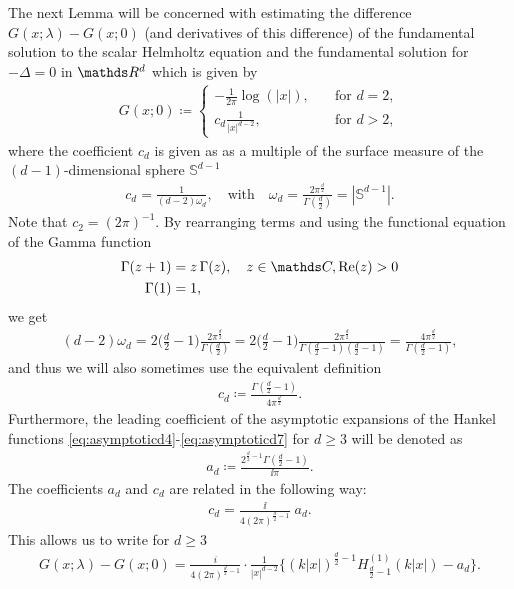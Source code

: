 The next Lemma will be concerned with estimating the difference $G(x;\lambda) - G(x; 0)$ (and derivatives of this difference) of the fundamental solution to the scalar Helmholtz equation and the fundamental solution for $-\Delta = 0$ in $\R^d$ which is given by
\begin{align}
  \label{eq:laplace}
  G(x;0) \coloneqq \begin{cases} -\frac{1}{2\pi} \log(|x|), &\quad\text{for } d = 2, \\c_d \frac{1}{|x|^{d - 2}}, &\quad\text{for } d > 2,  \end{cases}
\end{align}
where the coefficient $c_d$ is given as as a multiple of the surface measure of the $(d-1)$-dimensional sphere $\mathbb{S}^{d - 1}$
\begin{align}
  \label{eq:wd}
  c_d = \frac{1}{(d - 2) \omega_d}, \quad\text{with}\quad \omega_d = \frac{2\pi^{\frac{d}{2}}}{\Gamma(\frac{d}{2})} = |\mathbb{S}^{d - 1}|.
\end{align}
Note that $c_2 = (2 \pi)^{-1}$.
By rearranging terms and using the functional equation of the Gamma function 
\begin{align}
  \label{eq:functionalGamma}
  \begin{alignedat}{1}
    \Gamma(z + 1) &= z\, \Gamma(z), \quad z \in \C, \Re(z) > 0 \\
    \Gamma(1) &= 1,
  \end{alignedat}
\end{align}
we get
\begin{align*}
  (d - 2) \omega_d 
  = 2  \bigg( \frac{d}{2} - 1\bigg) \frac{2 \pi^{\frac{d}{2}}}{\Gamma(\frac{d}{2})}
  =  2 \bigg(\frac{d}{2} - 1\bigg) \frac{2 \pi^{\frac{d}{2}}}{\Gamma(\frac{d}{2} - 1)(\frac{d}{2} - 1)}
  = \frac{4 \pi^{\frac{d}{2}}}{\Gamma(\frac{d}{2} - 1)},
\end{align*}
and thus we will also sometimes use the equivalent definition
\begin{align}
  \label{eq:defncd}
  c_d \coloneqq \frac{\Gamma(\frac{d}{2} - 1)}{4 \pi^{\frac{d}{2}}}.
\end{align}
Furthermore, the leading coefficient of the asymptotic expansions of the Hankel functions \eqref{eq:asymptoticd4}-\eqref{eq:asymptoticd7} for $d \geq 3$ will be denoted as
\begin{align}
  \label{eq:Defnad}
  a_d \coloneqq \frac{2^{\frac{d}{2} - 1} \Gamma(\frac{d}{2} - 1)}{\ii \pi}.
\end{align}
The coefficients $a_d$ and $c_d$ are related in the following way:
\begin{align*}
  c_d 
  =\frac{\ii} {4 (2 \pi)^{\frac{d}{2} - 1}}\; a_d .
\end{align*}
This allows us to write for $d \geq 3$
\begin{align}
  \label{eq:HelmholtzLaplaceDifference}
  G(x;\lambda) - G(x; 0) = \frac{i}{4(2\pi)^{\frac{d}{2} - 1}} \cdot \frac{1}{|x|^{d - 2}} \Big\{ (k|x|)^{\frac{d}{2} - 1} H_{\frac{d}{2} - 1}^{(1)}(k|x|) - a_d \Big\}.
\end{align}

